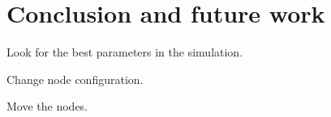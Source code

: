 \chapter{Conclusion and future work}

Look for the best parameters in the simulation.

Change node configuration.

Move the nodes.


